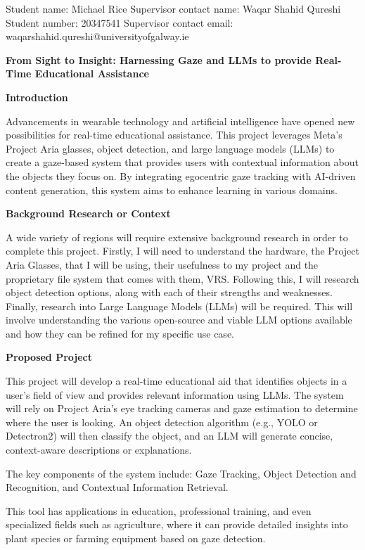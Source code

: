 \documentclass[11pt]{article}
\newcommand{\sect}[1]{\begin{center}\textbf{#1}\end{center}}
\begin{document}
	
\noindent Student name: Michael Rice \tabto{8.5cm} Supervisor contact name: Waqar Shahid Qureshi \\
\noindent Student number: 20347541 \tabto{8.5cm} Supervisor contact email: waqarshahid.qureshi@universityofgalway.ie 
\vspace{0.1cm}

\sect{From Sight to Insight: Harnessing Gaze and LLMs to provide Real-Time Educational Assistance}

\sect{Introduction}

Advancements in wearable technology and artificial intelligence have opened new possibilities for real-time educational assistance. 
This project leverages Meta’s Project Aria \cite{engelProjectAriaNew2023} glasses, object detection, and large language models (LLMs) 
to create a gaze-based system that provides users with contextual information about the objects they focus on. By integrating 
egocentric gaze tracking with AI-driven content generation, this system aims to enhance learning in various domains.

\sect{Background Research or Context}

A wide variety of regions will require extensive background research in order to complete this project. Firstly, I will need to 
understand the hardware, the Project Aria Glasses, that I will be using, their usefulness to my project and the proprietary file system that comes with them, VRS.
Following this, I will research object detection options, along with each of their strengths and 
weaknesses.
Finally, research into Large Language Models (LLMs) will be required. This will involve understanding the various open-source and 
viable LLM options available and how they can be refined for my specific use case.

\sect{Proposed Project}
This project will develop a real-time educational aid that identifies objects in a user's field of view and provides relevant 
information using LLMs. The system will rely on Project Aria’s eye tracking cameras and gaze estimation to determine where the user 
is looking. An object detection algorithm (e.g., YOLO \cite{redmonYouOnlyLook2016} or Detectron2) will then classify the object, and an LLM will generate 
concise, context-aware descriptions or explanations.

The key components of the system include: Gaze Tracking, Object Detection and Recognition, and Contextual Information Retrieval.

This tool has applications in education, professional training, and even specialized fields such as agriculture, where it can provide
detailed insights into plant species or farming equipment based on gaze detection.
\end{document}
